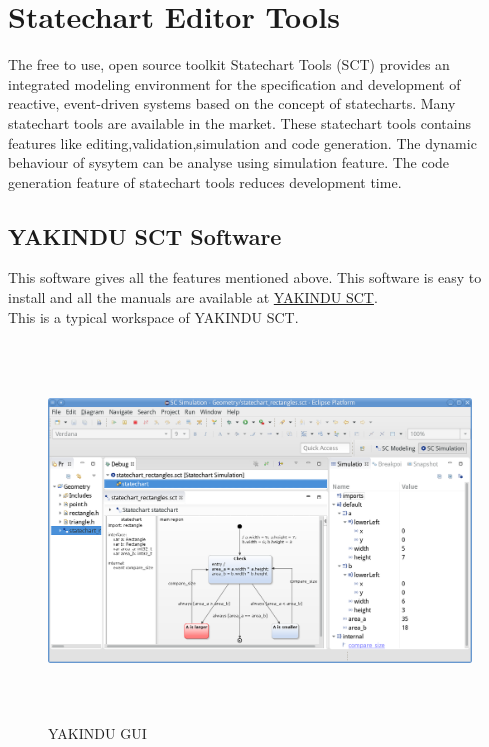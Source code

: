 \documentclass{article}
\begin{document}
\section{Statechart Editor Tools}
The free to use, open source toolkit Statechart Tools (SCT) provides an integrated modeling environment for the specification and development of reactive, event-driven systems based on the concept of statecharts. Many statechart tools are available in the market. These statechart tools contains features like editing,validation,simulation and code generation. The dynamic behaviour of sysytem can be analyse using simulation feature. The code generation feature of statechart tools reduces development time.
\subsection{YAKINDU SCT Software}
This software gives all the features mentioned above. This software is easy to install and all the manuals are available at \href{https://www.itemis.com/en/yakindu/statechart-tools/}{YAKINDU SCT}.\\
This is a typical workspace of YAKINDU SCT.
\begin{figure}[h]
\centering
\includegraphics[width=12cm,height=10cm]{gui.png}
\caption{YAKINDU GUI}
\end{figure}\\
\newpage
\end{document}
